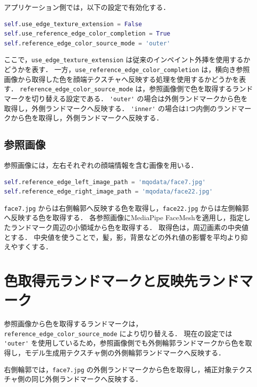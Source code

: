 \documentclass[uplatex,dvipdfmx]{jsarticle}
\begin{document}
アプリケーション側では，以下の設定で有効化する．

\begin{lstlisting}[language=Python]
self.use_edge_texture_extension = False
self.use_reference_edge_color_completion = True
self.reference_edge_color_source_mode = 'outer'
\end{lstlisting}

ここで，\verb|use_edge_texture_extension| は従来のインペイント外挿を使用するかどうかを表す．
一方，\verb|use_reference_edge_color_completion| は，横向き参照画像から取得した色を顔端テクスチャへ反映する処理を使用するかどうかを表す．
\verb|reference_edge_color_source_mode| は，参照画像側で色を取得するランドマークを切り替える設定である．
\verb|'outer'| の場合は外側ランドマークから色を取得し，外側ランドマークへ反映する．
\verb|'inner'| の場合は1つ内側のランドマークから色を取得し，外側ランドマークへ反映する．

\subsection{参照画像}

参照画像には，左右それぞれの顔端情報を含む画像を用いる．

\begin{lstlisting}[language=Python]
self.reference_edge_left_image_path = 'mqodata/face7.jpg'
self.reference_edge_right_image_path = 'mqodata/face22.jpg'
\end{lstlisting}

\verb|face7.jpg| からは右側輪郭へ反映する色を取得し，\verb|face22.jpg| からは左側輪郭へ反映する色を取得する．
各参照画像にMediaPipe FaceMeshを適用し，指定したランドマーク周辺の小領域から色を取得する．
取得色は，周辺画素の中央値とする．
中央値を使うことで，髪，影，背景などの外れ値の影響を平均より抑えやすくする．

\section{色取得元ランドマークと反映先ランドマーク}

参照画像から色を取得するランドマークは，\verb|reference_edge_color_source_mode| により切り替える．
現在の設定では \verb|'outer'| を使用しているため，参照画像側でも外側輪郭ランドマークから色を取得し，モデル生成用テクスチャ側の外側輪郭ランドマークへ反映する．

右側輪郭では，\verb|face7.jpg| の外側ランドマークから色を取得し，補正対象テクスチャ側の同じ外側ランドマークへ反映する．
\end{document}
